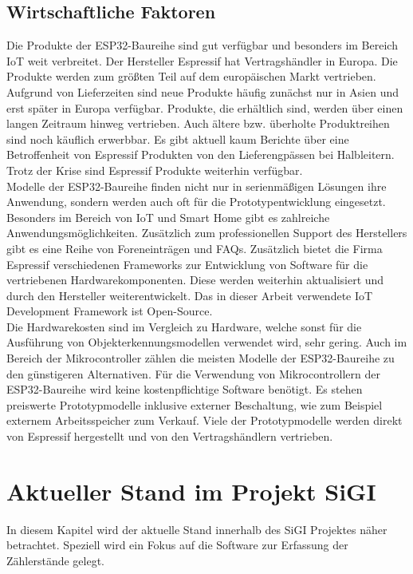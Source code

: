 \subsection{Wirtschaftliche Faktoren}
    Die Produkte der ESP32-Baureihe sind gut verfügbar und besonders im Bereich IoT weit verbreitet. Der Hersteller Espressif hat Vertragshändler in Europa. Die Produkte werden zum größten Teil auf dem europäischen Markt vertrieben. Aufgrund von Lieferzeiten sind neue Produkte häufig zunächst nur in Asien und erst später in Europa verfügbar. Produkte, die erhältlich sind, werden über einen langen Zeitraum hinweg vertrieben. Auch ältere bzw. überholte Produktreihen sind noch käuflich erwerbbar. Es gibt aktuell kaum Berichte über eine Betroffenheit von Espressif Produkten von den Lieferengpässen bei Halbleitern. Trotz der Krise sind Espressif Produkte weiterhin verfügbar\cite{Oner2021}.\\ Modelle der ESP32-Baureihe finden nicht nur in serienmäßigen Lösungen ihre Anwendung, sondern werden auch oft für die Prototypentwicklung eingesetzt. Besonders im Bereich von IoT und Smart Home gibt es zahlreiche Anwendungsmöglichkeiten. Zusätzlich zum professionellen Support des Herstellers gibt es eine Reihe von Foreneinträgen und FAQs. Zusätzlich bietet die Firma Espressif verschiedenen Frameworks zur Entwicklung von Software für die vertriebenen Hardwarekomponenten. Diese werden weiterhin aktualisiert und durch den Hersteller weiterentwickelt. Das in dieser Arbeit verwendete IoT Development Framework ist Open-Source\cite{ESPIDF}.\\ Die Hardwarekosten sind im Vergleich zu Hardware, welche sonst für die Ausführung von Objekterkennungsmodellen verwendet wird, sehr gering. Auch im Bereich der Mikrocontroller zählen die meisten Modelle der ESP32-Baureihe zu den günstigeren Alternativen. Für die Verwendung von Mikrocontrollern der ESP32-Baureihe wird keine kostenpflichtige Software benötigt. Es stehen preiswerte Prototypmodelle inklusive externer Beschaltung, wie zum Beispiel externem Arbeitsspeicher zum Verkauf. Viele der Prototypmodelle werden direkt von Espressif hergestellt und von den Vertragshändlern vertrieben\cite{Oner2021}. 
    
\section{Aktueller Stand im Projekt SiGI}\label{sec:Aktueller Stand im Projekt SiGI}
    In diesem Kapitel wird der aktuelle Stand innerhalb des SiGI Projektes näher betrachtet. Speziell wird ein Fokus auf die Software zur Erfassung der Zählerstände gelegt.

